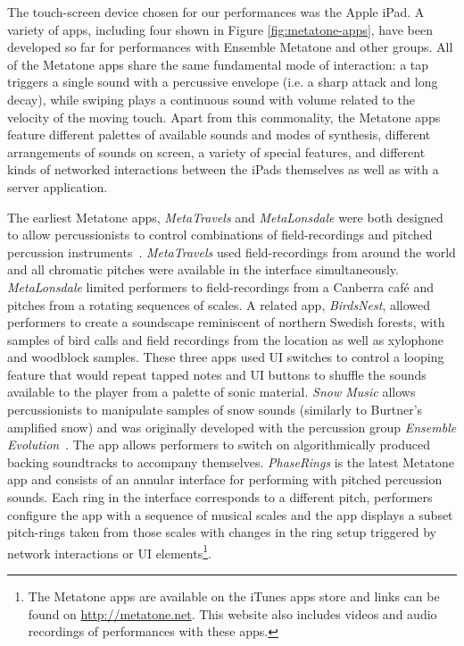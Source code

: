 \documentclass[graybox]{svmult}
\begin{document}
The touch-screen device chosen for our performances was the Apple
iPad. A variety of apps, including four shown in Figure
\ref{fig:metatone-apps}, have been developed so far for performances
with Ensemble Metatone and other groups. All of the Metatone apps
share the same fundamental mode of interaction: a tap triggers a
single sound with a percussive envelope (i.e. a sharp attack and long
decay), while swiping plays a continuous sound with volume related to
the velocity of the moving touch. Apart from this commonality, the
Metatone apps feature different palettes of available sounds and modes
of synthesis, different arrangements of sounds on screen, a variety of
special features, and different kinds of networked interactions
between the iPads themselves as well as with a server application.

The earliest Metatone apps, \emph{MetaTravels} and \emph{MetaLonsdale}
were both designed to allow percussionists to control combinations of
field-recordings and pitched percussion
instruments~\cite{Martin:2014xp}. \emph{MetaTravels} used
field-recordings from around the world and all chromatic pitches were
available in the interface simultaneously. \emph{MetaLonsdale} limited
performers to field-recordings from a Canberra caf\'e and pitches from
a rotating sequences of scales. A related app, \emph{BirdsNest},
allowed performers to create a soundscape reminiscent of northern
Swedish forests, with samples of bird calls and field recordings from
the location as well as xylophone and woodblock samples. These three
apps used UI switches to control a looping feature that would repeat
tapped notes and UI buttons to shuffle the sounds available to the
player from a palette of sonic material. \emph{Snow Music} allows
percussionists to manipulate samples of snow sounds (similarly to
Burtner's amplified snow) and was originally developed with the
percussion group \emph{Ensemble Evolution}~\cite{Martin:2012fk}. The
app allows performers to switch on algorithmically produced backing
soundtracks to accompany themselves. \emph{PhaseRings} is the latest
Metatone app and consists of an annular interface for performing with
pitched percussion sounds. Each ring in the interface corresponds to a
different pitch, performers configure the app with a sequence of
musical scales and the app displays a subset pitch-rings taken from
those scales with changes in the ring setup triggered by network
interactions or UI elements\footnote{The Metatone apps are available
  on the iTunes apps store and links can be found on
  \url{http://metatone.net}. This website also includes videos and
  audio recordings of performances with these apps.}.
\end{document}
